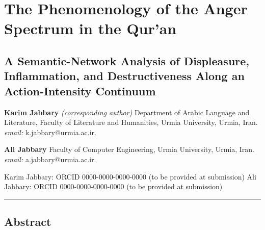 \section{The Phenomenology of the Anger Spectrum in the
Qur'an}\label{the-phenomenology-of-the-anger-spectrum-in-the-quran}

\subsection{A Semantic-Network Analysis of Displeasure, Inflammation,
and Destructiveness Along an Action-Intensity
Continuum}\label{a-semantic-network-analysis-of-displeasure-inflammation-and-destructiveness-along-an-action-intensity-continuum}

\textbf{Karim Jabbary} \emph{(corresponding author)} Department of
Arabic Language and Literature, Faculty of Literature and Humanities,
Urmia University, Urmia, Iran. \emph{email:} k.jabbary@urmia.ac.ir.

\textbf{Ali Jabbary} Faculty of Computer Engineering, Urmia University,
Urmia, Iran. \emph{email:} a.jabbary@urmia.ac.ir.

Karim Jabbary: ORCID 0000-0000-0000-0000 (to be provided at submission)
Ali Jabbary: ORCID 0000-0000-0000-0000 (to be provided at submission)

\begin{center}\rule{0.5\linewidth}{0.5pt}\end{center}

\subsection{Abstract}\label{abstract}

